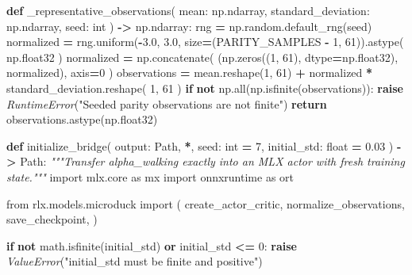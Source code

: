 \documentclass[
  american,
  11pt,
  letterpaper,
]{article}
\newenvironment{Shaded}{\begin{snugshade}}{\end{snugshade}}
\newcommand{\BuiltInTok}[1]{#1}
\newcommand{\CommentTok}[1]{\textcolor[rgb]{0.56,0.35,0.01}{\textit{#1}}}
\newcommand{\ControlFlowTok}[1]{\textcolor[rgb]{0.13,0.29,0.53}{\textbf{#1}}}
\newcommand{\DecValTok}[1]{\textcolor[rgb]{0.00,0.00,0.81}{#1}}
\newcommand{\FloatTok}[1]{\textcolor[rgb]{0.00,0.00,0.81}{#1}}
\newcommand{\ImportTok}[1]{#1}
\newcommand{\KeywordTok}[1]{\textcolor[rgb]{0.13,0.29,0.53}{\textbf{#1}}}
\newcommand{\NormalTok}[1]{#1}
\newcommand{\OperatorTok}[1]{\textcolor[rgb]{0.81,0.36,0.00}{\textbf{#1}}}
\newcommand{\PreprocessorTok}[1]{\textcolor[rgb]{0.56,0.35,0.01}{\textit{#1}}}
\newcommand{\StringTok}[1]{\textcolor[rgb]{0.31,0.60,0.02}{#1}}
\renewenvironment{Shaded}{\par\smallskip}{\par\smallskip}
\begin{document}
\begin{Shaded}
\begin{Highlighting}[]
\KeywordTok{def}\NormalTok{ \_representative\_observations(}
\NormalTok{    mean: np.ndarray, standard\_deviation: np.ndarray, seed: }\BuiltInTok{int}
\NormalTok{) }\OperatorTok{{-}\textgreater{}}\NormalTok{ np.ndarray:}
\NormalTok{    rng }\OperatorTok{=}\NormalTok{ np.random.default\_rng(seed)}
\NormalTok{    normalized }\OperatorTok{=}\NormalTok{ rng.uniform(}\OperatorTok{{-}}\FloatTok{3.0}\NormalTok{, }\FloatTok{3.0}\NormalTok{, size}\OperatorTok{=}\NormalTok{(PARITY\_SAMPLES }\OperatorTok{{-}} \DecValTok{1}\NormalTok{, }\DecValTok{61}\NormalTok{)).astype(}
\NormalTok{        np.float32}
\NormalTok{    )}
\NormalTok{    normalized }\OperatorTok{=}\NormalTok{ np.concatenate(}
\NormalTok{        (np.zeros((}\DecValTok{1}\NormalTok{, }\DecValTok{61}\NormalTok{), dtype}\OperatorTok{=}\NormalTok{np.float32), normalized), axis}\OperatorTok{=}\DecValTok{0}
\NormalTok{    )}
\NormalTok{    observations }\OperatorTok{=}\NormalTok{ mean.reshape(}\DecValTok{1}\NormalTok{, }\DecValTok{61}\NormalTok{) }\OperatorTok{+}\NormalTok{ normalized }\OperatorTok{*}\NormalTok{ standard\_deviation.reshape(}
        \DecValTok{1}\NormalTok{, }\DecValTok{61}
\NormalTok{    )}
    \ControlFlowTok{if} \KeywordTok{not}\NormalTok{ np.}\BuiltInTok{all}\NormalTok{(np.isfinite(observations)):}
        \ControlFlowTok{raise} \PreprocessorTok{RuntimeError}\NormalTok{(}\StringTok{"Seeded parity observations are not finite"}\NormalTok{)}
    \ControlFlowTok{return}\NormalTok{ observations.astype(np.float32)}


\KeywordTok{def}\NormalTok{ initialize\_bridge(}
\NormalTok{    output: Path, }\OperatorTok{*}\NormalTok{, seed: }\BuiltInTok{int} \OperatorTok{=} \DecValTok{7}\NormalTok{, initial\_std: }\BuiltInTok{float} \OperatorTok{=} \FloatTok{0.03}
\NormalTok{) }\OperatorTok{{-}\textgreater{}}\NormalTok{ Path:}
    \CommentTok{"""Transfer alpha\_walking exactly into an MLX actor with fresh training state."""}
    \ImportTok{import}\NormalTok{ mlx.core }\ImportTok{as}\NormalTok{ mx}
    \ImportTok{import}\NormalTok{ onnxruntime }\ImportTok{as}\NormalTok{ ort}

    \ImportTok{from}\NormalTok{ rlx.models.microduck }\ImportTok{import}\NormalTok{ (}
\NormalTok{        create\_actor\_critic,}
\NormalTok{        normalize\_observations,}
\NormalTok{        save\_checkpoint,}
\NormalTok{    )}

    \ControlFlowTok{if} \KeywordTok{not}\NormalTok{ math.isfinite(initial\_std) }\KeywordTok{or}\NormalTok{ initial\_std }\OperatorTok{\textless{}=} \DecValTok{0}\NormalTok{:}
        \ControlFlowTok{raise} \PreprocessorTok{ValueError}\NormalTok{(}\StringTok{"initial\_std must be finite and positive"}\NormalTok{)}


\end{Highlighting}
\end{Shaded}
\end{document}
